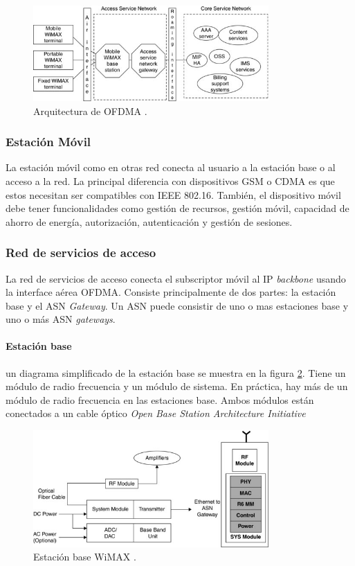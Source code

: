 \documentclass[10pt,journal,compsoc]{IEEEtran}
\begin{document}
\begin{figure}[h]
    \centering
    \includegraphics[width=9cm]{wimax-architecture}
    \caption{Arquitectura de OFDMA \cite{mishra}.}
    \label{fig:wimax-architecture}
\end{figure}

\subsubsection{Estación Móvil}
La estación móvil como en otras red conecta al usuario a la estación base o al acceso a la red. La principal diferencia con dispositivos GSM o CDMA es que estos necesitan ser compatibles con IEEE 802.16. También, el dispositivo móvil debe tener funcionalidades como gestión de recursos, gestión móvil, capacidad de ahorro de energía, autorización, autenticación y gestión de sesiones.

\subsubsection{Red de servicios de acceso}
La red de servicios de acceso conecta el subscriptor móvil al IP \emph{backbone} usando la interface aérea OFDMA. Consiste principalmente de dos partes: la estación base y el ASN \emph{Gateway}. Un ASN puede consistir de uno o mas estaciones base y uno o más ASN \emph{gateways}.

\paragraph{Estación base} un diagrama simplificado de la estación base se muestra en la figura \ref{fig:base-station}. Tiene un módulo de radio frecuencia y un módulo de sistema. En práctica, hay más de un módulo de radio frecuencia en las estaciones base. Ambos módulos están conectados a un cable óptico \emph{Open Base Station Architecture Initiative}

\begin{figure}[h]
    \centering
    \includegraphics[width=9cm]{base-station}
    \caption{Estación base WiMAX \cite{mishra}.}
    \label{fig:base-station}
\end{figure}
\end{document}
